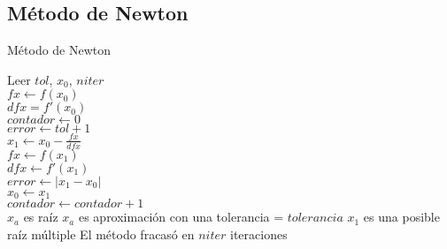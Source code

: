 \documentclass[12pt]{article}
\begin{document}
\subsection{Método de Newton}
\begin{algorithm}[H]
	\caption{Método de Newton}
	\SetAlgoLined
	Leer $tol$, $x_0$, $niter$\\
	$fx \leftarrow f(x_0)$\\
	$dfx = f'(x_0)$\\
	$contador \leftarrow 0$ \\
	$error \leftarrow tol + 1$\\
	{
		$x_1 \leftarrow x_0 - \frac{fx}{dfx}$\\
		$fx \leftarrow f(x_1)$\\
		$dfx \leftarrow f'(x_1)$\\
		$error \leftarrow |x_1 - x_0|$\\
		$x_0 \leftarrow x_1$\\
		$contador \leftarrow contador + 1$\\
	}
	{$x_a$ es raíz}
	{$x_a$ es aproximación con una tolerancia = $tolerancia$}
	{$x_1$ es una posible raíz múltiple}
	\Else
	{El método fracasó en $niter$ iteraciones}	
\end{algorithm}
\end{document}
